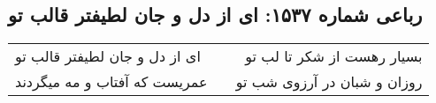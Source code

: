 \begin{center}
\section*{رباعی شماره ۱۵۳۷: ای از دل و جان لطیفتر قالب تو}
\label{sec:1537}
\begin{longtable}{l p{0.5cm} r}
ای از دل و جان لطیفتر قالب تو
&&
بسیار رهست از شکر تا لب تو
\\
عمریست که آفتاب و مه میگردند
&&
روزان و شبان در آرزوی شب تو
\\
\end{longtable}
\end{center}
